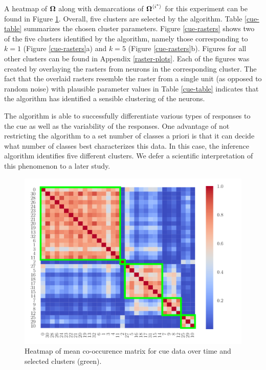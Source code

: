 \documentclass[twoside]{article}
\begin{document}
A heatmap of $\boldsymbol{\Omega}$ along with demarcations of $\boldsymbol{\Omega}^{\langle i^*\rangle}_{}$ for this experiment can be found in Figure \ref{cue-hm}. Overall, five clusters are selected by the algorithm.  Table \ref{cue-table} summarizes the chosen cluster parameters. Figure \ref{cue-rasters} shows two of the five clusters identified by the algorithm, namely those corresponding to $k = 1$ (Figure \ref{cue-rasters}a) and $k = 5$ (Figure \ref{cue-rasters}b). Figures for all other clusters can be found in Appendix \ref{raster-plots}.  Each of the figures was created by overlaying the rasters from neurons in the corresponding cluster. The fact that the overlaid rasters resemble the raster from a single unit (as opposed to random noise) with plausible parameter values in Table \ref{cue-table} indicates that the algorithm has identified a sensible clustering of the neurons. 

The algorithm is able to successfully differentiate various types of responses to the cue as well as the variability of the responses. One advantage of not restricting the algorithm to a set number of classes a priori is that it can decide what number of classes best characterizes this data. In this case, the inference algorithm identifies five different clusters. We defer a scientific interpretation of this phenomenon to a later study. 

\begin{figure}[h]
\begin{center}
\includegraphics[scale=0.33]{../img/cue.pdf}
\end{center}
\caption{Heatmap of mean co-occurence matrix for cue data over time and selected clusters (green).} 
\label{cue-hm}
\end{figure}
\end{document}
